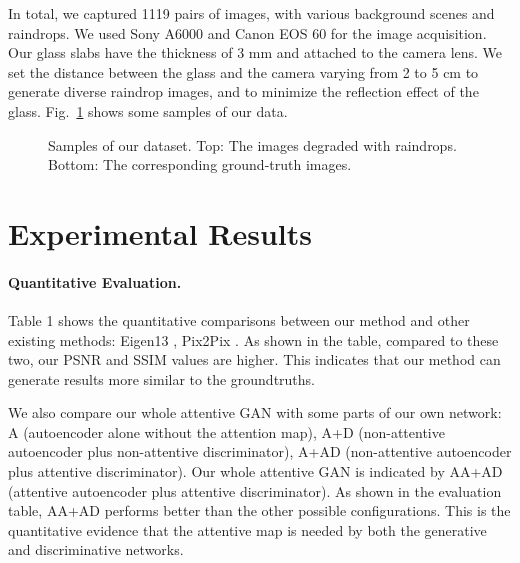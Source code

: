 \documentclass[10pt,twocolumn,letterpaper]{article}
\def\WIDTHSIX{0.23\linewidth}
\begin{document}
In total, we captured 1119 pairs of images, with various background scenes and raindrops. We used Sony A6000 and Canon EOS 60 for the image acquisition. Our glass slabs have the thickness of 3 mm and attached to the camera lens. We set the distance between
the glass and the camera varying from 2 to 5 cm to
generate diverse raindrop images, and to minimize the reflection effect of the glass. Fig.~\ref{fig:dataset_sample} shows some samples of our data. 

\begin{figure}
	\centering
	\vfill\vspace{-2.5mm}
\caption{Samples of our dataset. Top: The images degraded with raindrops. Bottom: The corresponding ground-truth images.}
\label{fig:dataset_sample}
\end{figure}






\section{Experimental Results}
\label{sec:results}

\paragraph{Quantitative Evaluation.}

Table 1 shows the quantitative comparisons between our method and other existing methods: Eigen13 \cite{eigen2013restoring}, Pix2Pix \cite{isola2016image}. As shown in the table, compared to these two,  our PSNR and SSIM values are higher. This indicates that our method can generate results  more similar to the groundtruths.

We also compare our whole attentive GAN with some parts of our own network: A (autoencoder alone without the attention map), A+D (non-attentive autoencoder plus non-attentive discriminator), A+AD (non-attentive autoencoder plus attentive discriminator). Our whole attentive GAN is indicated by AA+AD (attentive autoencoder plus attentive discriminator). As shown in the evaluation table, AA+AD  performs better than the other possible configurations. This is the quantitative evidence that the attentive map is needed by both the generative and discriminative networks.
\end{document}
